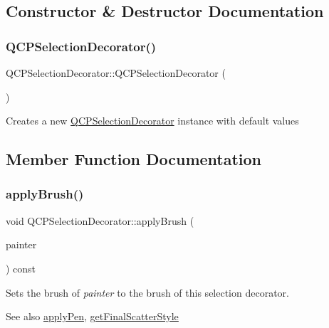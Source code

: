 \subsection{Constructor \& Destructor Documentation}
\mbox{\label{class_q_c_p_selection_decorator_aa145480d9a062cd176fe30900bb7bca8}} 
\subsubsection{\texorpdfstring{Q\+C\+P\+Selection\+Decorator()}{QCPSelectionDecorator()}}
{\footnotesize\ttfamily Q\+C\+P\+Selection\+Decorator\+::\+Q\+C\+P\+Selection\+Decorator (\begin{DoxyParamCaption}{ }\end{DoxyParamCaption})}

Creates a new \mbox{\hyperlink{class_q_c_p_selection_decorator}{Q\+C\+P\+Selection\+Decorator}} instance with default values 

\subsection{Member Function Documentation}
\mbox{\label{class_q_c_p_selection_decorator_a225544527d51b49546b70d0e6d655a34}} 
\subsubsection{\texorpdfstring{apply\+Brush()}{applyBrush()}}
{\footnotesize\ttfamily void Q\+C\+P\+Selection\+Decorator\+::apply\+Brush (\begin{DoxyParamCaption}\item[{\mbox{\hyperlink{class_q_c_p_painter}{Q\+C\+P\+Painter}} $\ast$}]{painter }\end{DoxyParamCaption}) const}

Sets the brush of {\itshape painter} to the brush of this selection decorator.

\begin{DoxySeeAlso}{See also}
\mbox{\hyperlink{class_q_c_p_selection_decorator_a75098893f7d08660ea449206810679d7}{apply\+Pen}}, \mbox{\hyperlink{class_q_c_p_selection_decorator_a1277b373248896bc70e8cc1de96da9fa}{get\+Final\+Scatter\+Style}} 
\end{DoxySeeAlso}
\mbox{\label{class_q_c_p_selection_decorator_a75098893f7d08660ea449206810679d7}} 
